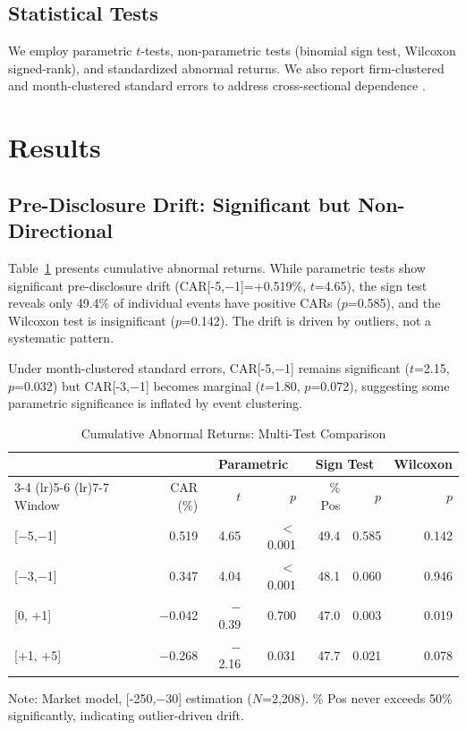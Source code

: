 \documentclass[12pt,a4paper]{article}
\begin{document}
\subsection{Statistical Tests}

We employ parametric $t$-tests, non-parametric tests (binomial sign test, Wilcoxon signed-rank), and standardized abnormal returns. We also report firm-clustered and month-clustered standard errors to address cross-sectional dependence \citep{kolari2010event}.

\section{Results}

\subsection{Pre-Disclosure Drift: Significant but Non-Directional}

Table~\ref{tab:car} presents cumulative abnormal returns. While parametric tests show significant pre-disclosure drift (CAR[-5,$-$1]=+0.519\%, $t$=4.65), the sign test reveals only 49.4\% of individual events have positive CARs ($p$=0.585), and the Wilcoxon test is insignificant ($p$=0.142). The drift is driven by outliers, not a systematic pattern.

Under month-clustered standard errors, CAR[-5,$-$1] remains significant ($t$=2.15, $p$=0.032) but CAR[-3,$-$1] becomes marginal ($t$=1.80, $p$=0.072), suggesting some parametric significance is inflated by event clustering.

\begin{table}[H]
\centering
\begin{threeparttable}
\caption{Cumulative Abnormal Returns: Multi-Test Comparison}
\label{tab:car}
\begin{tabular}{lrrrrrr}
\toprule
& & \multicolumn{2}{c}{Parametric} & \multicolumn{2}{c}{Sign Test} & {Wilcoxon} \\
\cmidrule(lr){3-4} \cmidrule(lr){5-6} \cmidrule(lr){7-7}
Window & CAR (\%) & $t$ & $p$ & \% Pos & $p$ & $p$ \\
\midrule
{[}$-$5,$-$1{]} & 0.519 & 4.65 & $<$0.001 & 49.4 & 0.585 & 0.142 \\
{[}$-$3,$-$1{]} & 0.347 & 4.04 & $<$0.001 & 48.1 & 0.060 & 0.946 \\
{[}0, +1{]} & $-$0.042 & $-$0.39 & 0.700 & 47.0 & 0.003 & 0.019 \\
{[}+1, +5{]} & $-$0.268 & $-$2.16 & 0.031 & 47.7 & 0.021 & 0.078 \\
\bottomrule
\end{tabular}
\begin{tablenotes}
\small
\item Note: Market model, [-250,$-$30] estimation ($N$=2,208). \% Pos never exceeds 50\% significantly, indicating outlier-driven drift.
\end{tablenotes}
\end{threeparttable}
\end{table}
\end{document}

